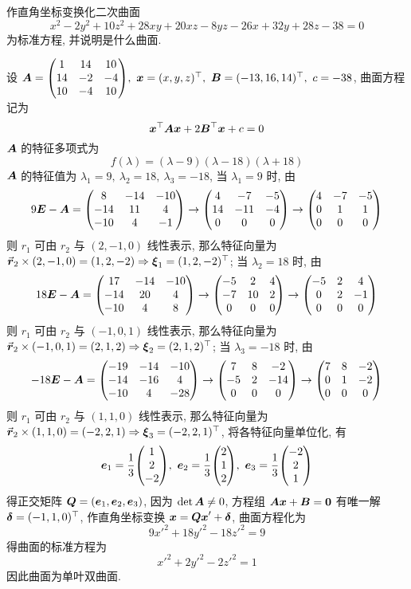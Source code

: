 \begin{example}
    作直角坐标变换化二次曲面 $$x^2-2y^2+10z^2+28xy+20xz-8yz-26x+32y+28z-38=0$$
    为标准方程, 并说明是什么曲面.
\end{example}
\begin{solution}
    设 $\vb*{A}=\mqty(1&14&10\\14&-2&-4\\10&-4&10),~\vb*{x}=(x,y,z)^\top,~\vb*{B}=(-13,16,14)^\top,~c=-38$, 曲面方程记为 $$\vb*{x}^\top\vb*{Ax}+2\vb*{B}^\top\vb*{x}+c=0$$
    $\vb*{A}$ 的特征多项式为 $$f(\lambda)=(\lambda-9)(\lambda-18)(\lambda+18)$$
    $\vb*{A}$ 的特征值为 $\lambda_1=9,~\lambda_2=18,~\lambda_3=-18$, 当 $\lambda_1=9$ 时, 由 $$9\vb*{E}-\vb*{A}=\mqty(8&-14&-10\\-14&11&4\\-10&4&-1)\to\mqty(4&-7&-5\\14&-11&-4\\0&0&0)\to\mqty(4&-7&-5\\0&1&1\\0&0&0)$$
    则 $r_1$ 可由 $r_2$ 与 $(2,-1,0)$ 线性表示, 那么特征向量为 $\va*{r}_2\times(2,-1,0)=(1,2,-2)\Rightarrow \vb*{\xi}_1=(1,2,-2)^\top$; 当 $\lambda_2=18$ 时, 由
    $$18\vb*{E}-\vb*{A}=\mqty(17&-14&-10\\-14&20&4\\-10&4&8)\to\mqty(-5&2&4\\-7&10&2\\0&0&0)\to\mqty(-5&2&4\\0&2&-1\\0&0&0)$$
    则 $r_1$ 可由 $r_2$ 与 $(-1,0,1)$ 线性表示, 那么特征向量为 $\va*{r}_2\times(-1,0,1)=(2,1,2)\Rightarrow\vb*{\xi}_2=(2,1,2)^\top$; 当 $\lambda_3=-18$ 时, 由
    $$-18\vb*{E}-\vb*{A}=\mqty(-19&-14&-10\\-14&-16&4\\-10&4&-28)\to\mqty(7&8&-2\\-5&2&-14\\0&0&0)\to\mqty(7&8&-2\\0&1&-2\\0&0&0)$$
    则 $r_1$ 可由 $r_2$ 与 $(1,1,0)$ 线性表示, 那么特征向量为 $\va*{r}_2\times(1,1,0)=(-2,2,1)\Rightarrow \vb*{\xi}_3=(-2,2,1)^\top$, 将各特征向量单位化, 有
    $$\vb*{e}_1=\dfrac{1}{3}\mqty(1\\2\\-2),~\vb*{e}_2=\dfrac{1}{3}\mqty(2\\1\\2),~\vb*{e}_3=\dfrac{1}{3}\mqty(-2\\2\\1)$$
    得正交矩阵 $\vb*{Q}=(\vb*{e}_1,\vb*{e}_2,\vb*{e}_3)$, 因为 $\det\vb*{A}\neq0$, 方程组 $\vb*{Ax}+\vb*{B}=\vb*{0}$ 有唯一解 $\vb*{\delta}=(-1,1,0)^\top$, 作直角坐标变换 $\vb*{x}=\vb*{Qx}'+\vb*{\delta}$, 曲面方程化为
    $$9x'^2+18y'^2-18z'^2=9$$
    得曲面的标准方程为 $$x'^2+2y'^2-2z'^2=1$$
    因此曲面为单叶双曲面.
\end{solution}
